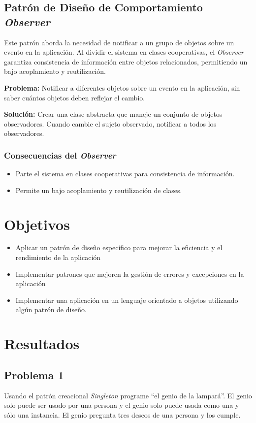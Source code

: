 \documentclass[11pt, twocolumn]{article}
\begin{document}
  \subsection*{Patrón de Diseño de Comportamiento \textit{Observer}}
  Este patrón aborda la necesidad de notificar a un grupo de objetos sobre un evento en la aplicación. Al dividir el sistema en clases cooperativas, el \textit{Observer} garantiza consistencia de información entre objetos relacionados, permitiendo un bajo acoplamiento y reutilización.

  \textbf{Problema:} Notificar a diferentes objetos sobre un evento en la aplicación, sin saber cuántos objetos deben reflejar el cambio.

  \textbf{Solución:} Crear una clase abstracta que maneje un conjunto de objetos observadores. Cuando cambie el sujeto observado, notificar a todos los observadores.

  \subsubsection*{Consecuencias del \textit{Observer}}
  \begin{itemize}
    \item Parte el sistema en clases cooperativas para consistencia de información.
    \item Permite un bajo acoplamiento y reutilización de clases.
  \end{itemize}

  \section*{Objetivos}
  \begin{itemize}
    \item Aplicar un patrón de diseño específico para mejorar la eficiencia y el rendimiento de la aplicación
    \item Implementar patrones que mejoren la gestión de errores y excepciones en la aplicación
    \item Implementar una aplicación en un lenguaje orientado a objetos utilizando algún patrón de diseño.
  \end{itemize}

  \section*{Resultados}
  \subsection*{Problema 1}
  Usando el patrón creacional \textit{Singleton} programe ``el genio de la lampará''. El genio solo puede ser usado por una persona y el genio solo puede usada como una y sólo una instancia. El genio pregunta tres deseos de una persona y los cumple.
\end{document}
